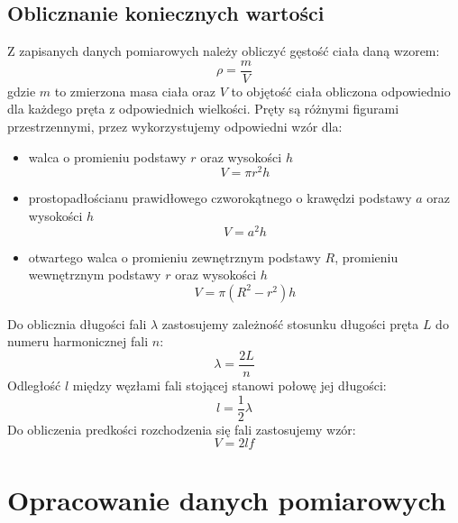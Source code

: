 \documentclass[a4paper,12pts]{article}
\begin{document}
\newpage
\subsection{Oblicznanie koniecznych wartości}
Z zapisanych danych pomiarowych należy obliczyć gęstość ciała daną wzorem:
\begin{equation}
\rho = \frac{m}{V}
\end{equation}
gdzie $m$ to zmierzona masa ciała oraz $V$ to objętość ciała obliczona odpowiednio dla każdego pręta z odpowiednich wielkości. Pręty są różnymi figurami przestrzennymi, przez wykorzystujemy odpowiedni wzór dla:
\begin{itemize}
	\item walca o promieniu podstawy $r$ oraz wysokości $h$
	\begin{equation}
	V = \pi r^2 h
	\end{equation}
	
	\item prostopadłościanu prawidłowego czworokątnego o krawędzi podstawy $a$ oraz wysokości $h$
	\begin{equation}
	V = a^2 h
	\end{equation}
	
	\item otwartego walca o promieniu zewnętrznym podstawy $R$, promieniu wewnętrznym podstawy $r$ oraz wysokości $h$
	\begin{equation}
	V = \pi (R^2 - r^2) h
	\end{equation}
\end{itemize}
Do oblicznia długości fali $\lambda$ zastosujemy zależność stosunku długości pręta $L$ do numeru harmonicznej fali $n$:
\begin{equation}
\lambda = \frac{2L}{n}
\end{equation}
Odległość $l$ między węzłami fali stojącej stanowi połowę jej długości:
\begin{equation}
l = \frac{1}{2} \lambda
\end{equation}
Do obliczenia predkości rozchodzenia się fali zastosujemy wzór:
\begin{equation}
V = 2lf
\end{equation}
\newpage
	
	\section{Opracowanie danych pomiarowych}
	
\end{document}
